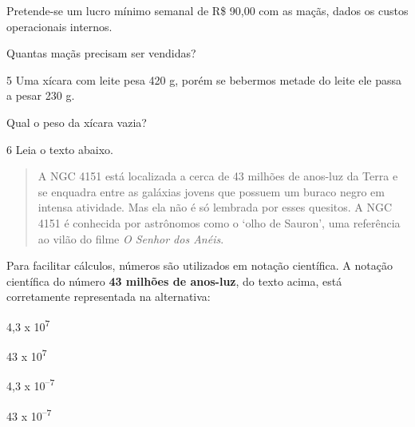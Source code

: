 Pretende-se um lucro mínimo semanal de R\$ 90,00 com as maçãs, dados os
custos operacionais internos.

Quantas maçãs precisam ser vendidas?

\begin{emptybox}
\end{emptybox}

\num{5} Uma xícara com leite pesa 420 g, porém se bebermos metade do
leite ele passa a pesar 230 g.

Qual o peso da xícara vazia?

\begin{emptybox}
\end{emptybox}

\pagebreak
\num{6} Leia o texto abaixo.

\begin{quote}
A NGC 4151 está localizada a cerca de 43 milhões de anos-luz
da Terra e se enquadra entre as galáxias jovens que possuem um buraco
negro em intensa atividade. Mas ela não é só lembrada por esses
quesitos. A NGC 4151 é conhecida por astrônomos como o `olho de Sauron',
uma referência ao vilão do filme \textit{O Senhor dos Anéis}.

\end{quote}

Para facilitar cálculos, números são utilizados em notação científica.
A notação científica do número \textbf{43 milhões de anos-luz}, do texto 
acima, está corretamente representada na alternativa:

\begin{minipage}{.5\textwidth}
\begin{escolha}
  \item 4,3 x 10\textsuperscript{7}

  \item 43 x 10\textsuperscript{7}

  \item 4,3 x 10\textsuperscript{--7}

  \item 43 x 10\textsuperscript{--7} 
\end{escolha}
\end{minipage}

